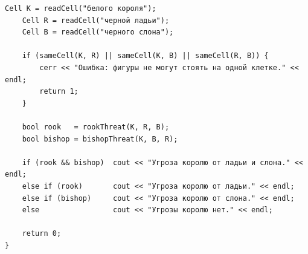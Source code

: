 \documentclass[12pt,a4paper]{article}
\begin{document}
\begin{Verbatim}[frame=single]
    Cell K = readCell("белого короля");
    Cell R = readCell("черной ладьи");
    Cell B = readCell("черного слона");

    if (sameCell(K, R) || sameCell(K, B) || sameCell(R, B)) {
        cerr << "Ошибка: фигуры не могут стоять на одной клетке." << endl;
        return 1;
    }

    bool rook   = rookThreat(K, R, B);
    bool bishop = bishopThreat(K, B, R);

    if (rook && bishop)  cout << "Угроза королю от ладьи и слона." << endl;
    else if (rook)       cout << "Угроза королю от ладьи." << endl;
    else if (bishop)     cout << "Угроза королю от слона." << endl;
    else                 cout << "Угрозы королю нет." << endl;

    return 0;
}
\end{Verbatim}
\end{document}
